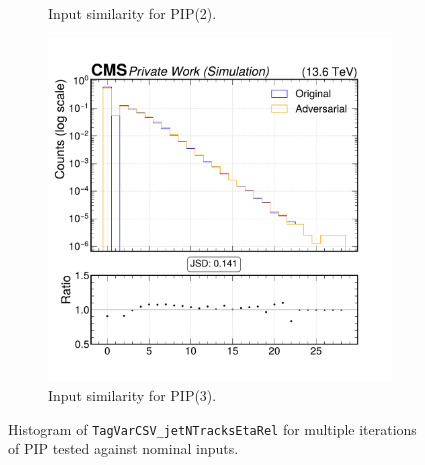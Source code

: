 \begin{figure}[h]
\begin{subfigure}[t]{0.32\textwidth}
    \caption{Input similarity for PIP(2).}
  \end{subfigure}\hfill
  \begin{subfigure}[t]{0.32\textwidth}
    \includegraphics[width=\linewidth]{media/output/features/compare/intprob_3/cmp_global_features_TagVarCSV_jetNTracksEtaRel.pdf}
    \caption{Input similarity for PIP(3).}
  \end{subfigure}

  \caption{Histogram of \texttt{TagVarCSV\_jetNTracksEtaRel} for multiple iterations of PIP tested against nominal inputs.}
  \label{fig:intprob_input_TagVarCSV_jetNTracksEtaRel}
\end{figure}

